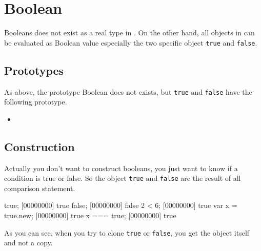 \section{Boolean}

Booleans does not exist as a real type in \us. On the other hand, all
objects in \us can be evaluated as Boolean value especially the two
specific object \lstinline|true| and \lstinline|false|.

\subsection{Prototypes}

As above, the prototype Boolean does not exists, but \lstinline|true|
and \lstinline|false| have the following prototype.

\begin{itemize}
\item {}
\end{itemize}

\subsection{Construction}

Actually you don't want to construct booleans, you just want to know
if a condition is true or false. So the object \lstinline|true| and
\lstinline|false| are the result of all comparison statement.

\begin{urbiscript}
true;
[00000000] true
false;
[00000000] false
2 < 6;
[00000000] true
var x = true.new;
[00000000] true
x === true;
[00000000] true
\end{urbiscript}

As you can see, when you try to clone \lstinline|true| or
\lstinline|false|, you get the object itself and not a copy.

